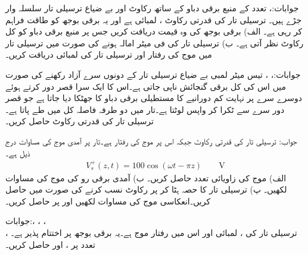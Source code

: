 جوابات:، 
تعدد  کے منبع برقی دباو کے ساتھ رکاوٹ  اور بے ضیاع ترسیلی تار سلسلہ وار جڑے ہیں۔ ترسیلی تار کی قدرتی رکاوٹ ، لمبائی  ہے اور یہ برقی بوجھ  کو طاقت فراہم کر رہی ہے۔ الف) برقی بوجھ کی وہ قیمت دریافت کریں جس پر منبع برقی دباو کو کل  رکاوٹ نظر آتی ہے۔ ب) ترسیلی تار کی فی میٹر امالہ  ہونے کی صورت میں ترسیلی تار میں موج کی رفتار اور ترسیلی تار کی لمبائی دریافت کریں۔ 

جوابات:، ، 
تیس میٹر لمبی بے ضیاع ترسیلی تار کے دونوں سرے آزاد رکھنے کی صورت میں اس کی کل برقی گنجائش  ناپی جاتی ہے۔اس کا ایک سرا قصر دور کرتے ہوئے دوسرے سرے پر نہایت کم دورانیے کا مستطیلی برقی دباو کا جھٹکا دیا جاتا ہے جو قصر دور سرے سے ٹکرا کر واپس لوٹتا ہے۔تار میں دو طرفہ فاصلہ کل  میں طے پاتا ہے۔ترسیلی تار کی قدرتی رکاوٹ حاصل کریں۔

جواب:  
ترسیلی تار کی قدرتی رکاوٹ  جبکہ اس پر موج کی رفتار  ہے۔تار پر آمدی موج کی مساوات درج ذیل ہے۔
\begin{align*}
V_s^{+}(z,t)=100 \cos(\omega t -\pi z) \quad \quad  \si{\volt}
\end{align*}
 الف) موج کی زاویائی تعدد حاصل کریں۔ ب) آمدی برقی رو کی موج کی مساوات لکھیں۔ پ) ترسیلی تار کا  حصہ ہٹا کر  پر  رکاوٹ نسب کرنے کی صورت میں  حاصل کریں۔انعکاسی موج  کی مساوات لکھیں اور  پر  حاصل کریں۔

جوابات:، ،
 ، \\
، 
ترسیلی تار کی ، لمبائی  اور اس میں رفتار موج  ہے۔یہ  برقی بوجھ پر اختتام پذیر ہے۔تعدد  پر  ،  اور  حاصل کریں۔


